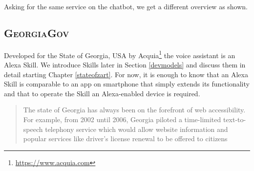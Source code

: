 
\noindent Asking for the same service on the chatbot, we get a %
different overview as shown. %
%



\subsection*{\textsc{GeorgiaGov}}
Developed for the State of Georgia, USA by Acquia\footnote{\url{https://www.acquia.com}} the voice assistant is an Alexa Skill. We introduce Skills later in Section \ref{devmodels} and discuss them in detail starting Chapter \ref{stateofzart}. For now, it is enough to know that an Alexa Skill is comparable to an app on smartphone that simply extends its functionality and that to operate the Skill an Alexa-enabled device is required.

\begin{quotation}
	\noindent The state of Georgia has always been on the forefront of web accessibility. For example, from 2002 until 2006, Georgia piloted a time-limited text-to-speech telephony service which would allow website information and popular services like driver's license renewal to be offered to citizens \cite{dries:georgia}
\end{quotation} 


